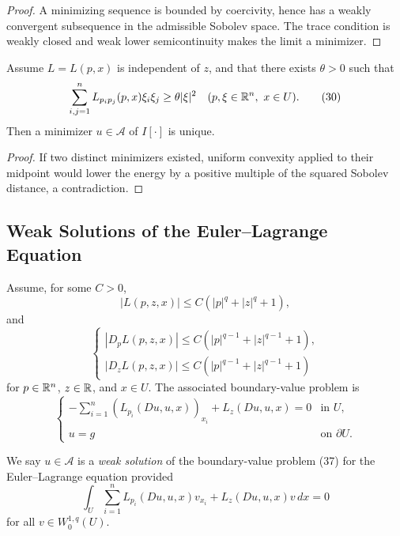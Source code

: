 \begin{proof}
\sketch A minimizing sequence is bounded by coercivity, hence has a weakly convergent subsequence in the admissible Sobolev space. The trace condition is weakly closed and weak lower semicontinuity makes the limit a minimizer.
\end{proof}

\begin{theorem}
\label{thm:uniqueness-minimizer-uniformly-convex}

Assume $L=L(p,x)$ is independent of $z$, and that there exists $\theta>0$ such that
\[
\sum_{i,j=1}^n L_{p_i p_j}(p,x)\xi_i\xi_j
\geq \theta|\xi|^2
\quad (p,\xi\in\mathbb{R}^n,\ x\in U).
\tag{30}
\]
Then a minimizer $u \in \mathcal{A}$ of $I[\cdot]$ is unique.
\end{theorem}

\begin{proof}
\sketch If two distinct minimizers existed, uniform convexity applied to their midpoint would lower the energy by a positive multiple of the squared Sobolev distance, a contradiction.
\end{proof}

\subsection{Weak Solutions of the Euler--Lagrange Equation}
\label{sec:euler-lagrange-equation-weak-solutions}

Assume, for some $C>0$,
\[
|L(p,z,x)|\leq C(|p|^q+|z|^q+1),
\tag{35}
\]
and
\[
\begin{cases}
|D_pL(p,z,x)|\leq C(|p|^{q-1}+|z|^{q-1}+1),\\
|D_zL(p,z,x)|\leq C(|p|^{q-1}+|z|^{q-1}+1)
\end{cases}
\tag{36}
\]
for $p\in\mathbb{R}^n$, $z\in\mathbb{R}$, and $x\in U$. The associated boundary-value problem is
\[
\begin{cases}
-\displaystyle\sum_{i=1}^n(L_{p_i}(Du,u,x))_{x_i}+L_z(Du,u,x)=0 & \text{in }U,\\
u=g & \text{on }\partial U.
\end{cases}
\tag{37}
\]

\begin{definition}
\label{def:weak-solution-euler-lagrange-scalar}
We say $u \in \mathcal{A}$ is a \textit{weak solution} of the boundary-value problem (37) for the Euler--Lagrange equation provided
\[
\int_U \sum_{i=1}^n L_{p_i}(Du,u,x) v_{x_i} + L_z(Du,u,x) v \, dx = 0
\]
for all $v \in W_0^{1,q}(U)$.
\end{definition}


